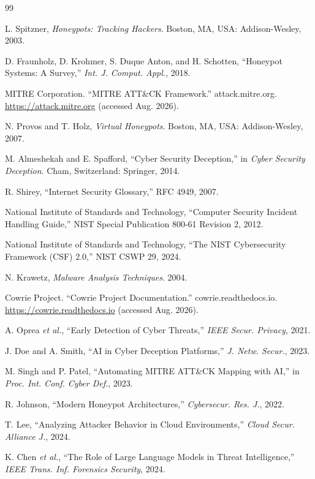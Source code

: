 \documentclass[12pt,a4paper]{report}
\begin{document}
\begin{thebibliography}{99}

L. Spitzner, \emph{Honeypots: Tracking Hackers}. Boston, MA, USA: Addison-Wesley, 2003.

D. Fraunholz, D. Krohmer, S. Duque Anton, and H. Schotten, ``Honeypot Systems: A Survey,'' \emph{Int. J. Comput. Appl.}, 2018.

MITRE Corporation. ``MITRE ATT\&CK Framework.'' attack.mitre.org. \url{https://attack.mitre.org} (accessed Aug. 2026).

N. Provos and T. Holz, \emph{Virtual Honeypots}. Boston, MA, USA: Addison-Wesley, 2007.

M. Almeshekah and E. Spafford, ``Cyber Security Deception,'' in \emph{Cyber Security Deception}. Cham, Switzerland: Springer, 2014.

R. Shirey, ``Internet Security Glossary,'' RFC 4949, 2007.

National Institute of Standards and Technology, ``Computer Security Incident Handling Guide,'' NIST Special Publication 800-61 Revision 2, 2012.

National Institute of Standards and Technology, ``The NIST Cybersecurity Framework (CSF) 2.0,'' NIST CSWP 29, 2024.

N. Krawetz, \emph{Malware Analysis Techniques}. 2004.

Cowrie Project. ``Cowrie Project Documentation.'' cowrie.readthedocs.io. \url{https://cowrie.readthedocs.io} (accessed Aug. 2026).

A. Oprea \emph{et al.}, ``Early Detection of Cyber Threats,'' \emph{IEEE Secur. Privacy}, 2021.

J. Doe and A. Smith, ``AI in Cyber Deception Platforms,'' \emph{J. Netw. Secur.}, 2023.

M. Singh and P. Patel, ``Automating MITRE ATT\&CK Mapping with AI,'' in \emph{Proc. Int. Conf. Cyber Def.}, 2023.

R. Johnson, ``Modern Honeypot Architectures,'' \emph{Cybersecur. Res. J.}, 2022.

T. Lee, ``Analyzing Attacker Behavior in Cloud Environments,'' \emph{Cloud Secur. Alliance J.}, 2024.

K. Chen \emph{et al.}, ``The Role of Large Language Models in Threat Intelligence,'' \emph{IEEE Trans. Inf. Forensics Security}, 2024.


\end{thebibliography}
\end{document}
